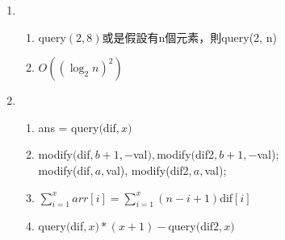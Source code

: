 \documentclass[a4paper, 12pt]{article}
\begin{document}
\begin{enumerate}
\begin{enumerate}
\begin{enumerate}
                    \end{enumerate}
            \end{enumerate}
        \item 
            \begin{enumerate}
                \item query$(2, 8)$或是假設有n個元素，則query(2, n)
                \item $O((\log_2 n)^2)$
            \end{enumerate}
        \item 
            \begin{enumerate}
                \item ans = query$($dif$, x)$
                \item modify$($dif$, b+1, -$val$), $modify$($dif2$, b+1, -$val);\\
                        modify(dif$, a, $val), modify(dif2$, a, $val);
                \item $\sum\limits_{i=1}^{x} arr[i] = \sum\limits_{i=1}^{x} (n-i+1)$dif$[i] $
                \item query$($dif$, x)*(x+1) - $query$($dif2$, x)$
            \end{enumerate}
    \end{enumerate}
\end{document}
